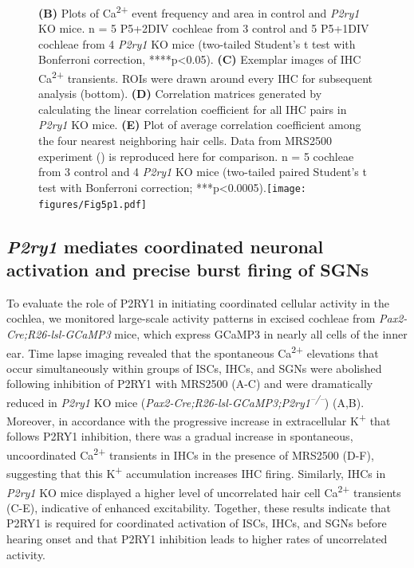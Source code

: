 \documentclass[9pt,lineno]{elife}
\begin{document}
\begin{figure}
\begin{fullwidth}
{\textbf{(B)} Plots of Ca\textsuperscript{2+} event frequency and area in control and \textit{P2ry1} KO mice. n = 5 P5+2DIV cochleae from 3 control and 5 P5+1DIV cochleae from 4 \textit{P2ry1} KO mice (two-tailed Student's t test with Bonferroni correction, ****p<0.05).
\textbf{(C)} Exemplar images of IHC Ca\textsuperscript{2+} transients. ROIs were drawn around every IHC for subsequent analysis (bottom). 
\textbf{(D)} Correlation matrices generated by calculating the linear correlation coefficient for all IHC pairs in \textit{P2ry1} KO mice.
\textbf{(E)} Plot of average correlation coefficient among the four nearest neighboring hair cells. Data from MRS2500 experiment () is reproduced here for comparison. n = 5 cochleae from 3 control and 4 \textit{P2ry1} KO mice (two-tailed paired Student's t test with Bonferroni correction; ***p<0.0005).}{\texttt{[image: figures/Fig5p1.pdf]}}\label{figsupp:sf5p1}
\end{fullwidth}
\end{figure}

\subsection{\textit{P2ry1} mediates coordinated neuronal activation and precise burst firing of SGNs}
To evaluate the role of P2RY1 in initiating coordinated cellular activity in the cochlea, we monitored large-scale activity patterns in excised cochleae from \textit{Pax2-Cre;R26-lsl-GCaMP3} mice, which express GCaMP3 in nearly all cells of the inner ear. Time lapse imaging revealed that the spontaneous Ca\textsuperscript{2+} elevations that occur simultaneously within groups of ISCs, IHCs, and SGNs \citep{Eckrich2018,Tritsch2010,Zhang-Hooks2016} were abolished following inhibition of P2RY1 with MRS2500 (A-C) and were dramatically reduced in \textit{P2ry1} KO mice (\textit{Pax2-Cre;R26-lsl-GCaMP3;P2ry1\textsuperscript{–/–}}) (A,B). Moreover, in accordance with the progressive increase in extracellular K\textsuperscript{+} that follows P2RY1 inhibition, there was a gradual increase in spontaneous, uncoordinated Ca\textsuperscript{2+} transients in IHCs in the presence of MRS2500 (D-F), suggesting that this K\textsuperscript{+} accumulation increases IHC firing. Similarly, IHCs in \textit{P2ry1} KO mice displayed a higher level of uncorrelated hair cell Ca\textsuperscript{2+} transients (C-E), indicative of enhanced excitability. Together, these results indicate that P2RY1 is required for coordinated activation of ISCs, IHCs, and SGNs before hearing onset and that P2RY1 inhibition leads to higher rates of uncorrelated activity.
\end{document}
